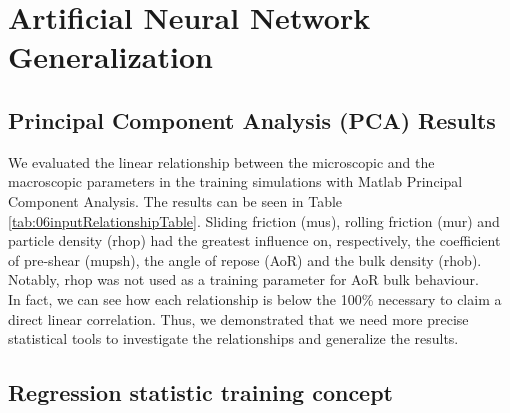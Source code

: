 
\chapter{Artificial Neural Network Generalization}
\label{cap:anntraining}

\section{Principal Component Analysis (PCA) Results}
\label{sec:pcaanalysis}

We evaluated the linear relationship between the microscopic and the
macroscopic parameters in the training simulations with Matlab Principal
Component Analysis.
The results can be seen in Table \ref{tab:06inputRelationshipTable}.
Sliding friction (\acs{mus}), rolling friction (\acs{mur}) and particle density (\acs{rhop})
had the greatest influence on, respectively, the coefficient of pre-shear
(\acs{mupsh}), the angle of repose  (\acs{AoR}) and the bulk density (\acs{rhob}). Notably, \acs{rhop}
was not used as a training parameter for \acs{AoR} bulk behaviour. \\
In fact, we can see how each relationship is below the 100\% necessary to claim
a direct linear correlation.
Thus, we demonstrated that we need more precise statistical tools to investigate
the relationships and generalize the results.



\section{Regression statistic training concept}
\label{sec:regressiontrainingconcept}



